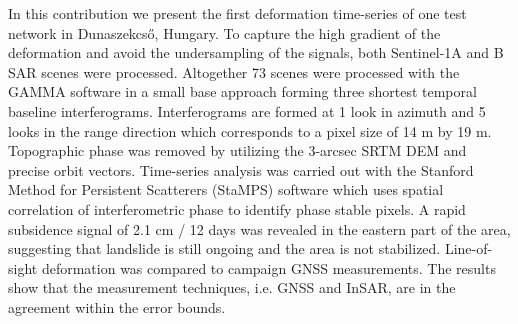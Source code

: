 \documentclass{article}
\begin{document}
In this contribution we present the first deformation time-series of one test network in Dunaszekcső, Hungary. To capture the high gradient of the deformation and avoid the undersampling of the signals, both Sentinel-1A and B SAR scenes were processed. Altogether 73 scenes were processed with the GAMMA software in a small base approach forming three shortest temporal baseline interferograms. Interferograms are formed at 1 look in azimuth and 5 looks in the range direction  which corresponds to a pixel size of 14 m by 19 m. Topographic phase was removed by utilizing the 3-arcsec SRTM DEM and precise orbit vectors. Time-series analysis was carried out with the Stanford Method for Persistent Scatterers (StaMPS) software which uses spatial correlation of interferometric phase to identify phase stable pixels.  A rapid subsidence signal of 2.1 cm / 12 days was revealed in the eastern part of the area, suggesting that landslide is still ongoing and the area is not stabilized. Line-of-sight deformation was compared to campaign GNSS measurements. The results show that the measurement techniques,  i.e. GNSS and InSAR, are in the agreement within the error bounds.
\end{document}
